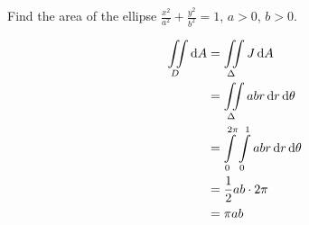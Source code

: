 \documentclass[fleqn, a4paper, 12pt, twoside]{article}
\theoremstyle{definition}
\theoremstyle{theorem}
\begin{document}
\begin{question}
	Find the area of the ellipse $\frac{x^2}{a^2} + \frac{y^2}{b^2} = 1$, $a > 0$, $b > 0$.
\end{question}

\begin{solution}
	\begin{align*}
		\iint\limits_{D} \dif A &= \iint\limits_{\Delta} J \dif A\\
		&= \iint\limits_{\Delta} a b r \dif r \dif \theta\\
		&= \int\limits_{0}^{2 \pi} \int\limits_{0}^{1} a b r \dif r \dif \theta\\
		&= \frac{1}{2} a b \cdot 2 \pi\\
		&= \pi a b
	\end{align*}
\end{solution}
\end{document}
